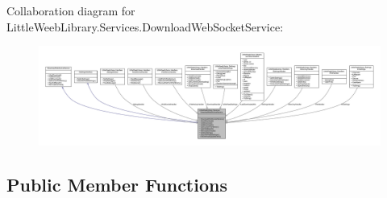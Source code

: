 Collaboration diagram for Little\+Weeb\+Library.\+Services.\+Download\+Web\+Socket\+Service\+:\nopagebreak
\begin{figure}[H]
\begin{center}
\leavevmode
\includegraphics[width=350pt]{class_little_weeb_library_1_1_services_1_1_download_web_socket_service__coll__graph}
\end{center}
\end{figure}
\subsection*{Public Member Functions}

